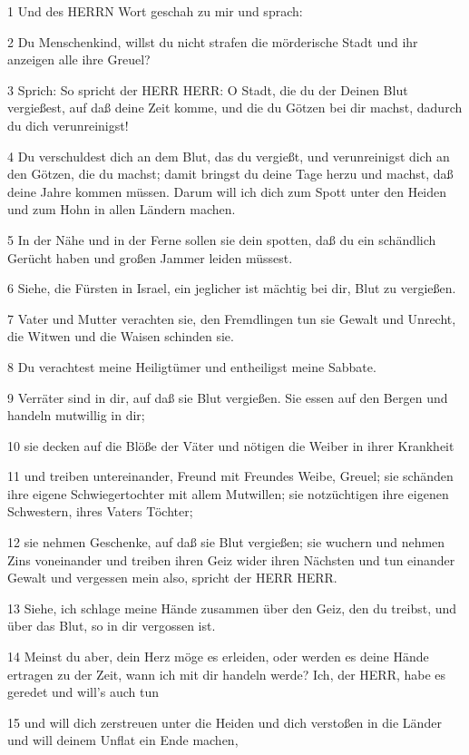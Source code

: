 \par 1 Und des HERRN Wort geschah zu mir und sprach:
\par 2 Du Menschenkind, willst du nicht strafen die mörderische Stadt und ihr anzeigen alle ihre Greuel?
\par 3 Sprich: So spricht der HERR HERR: O Stadt, die du der Deinen Blut vergießest, auf daß deine Zeit komme, und die du Götzen bei dir machst, dadurch du dich verunreinigst!
\par 4 Du verschuldest dich an dem Blut, das du vergießt, und verunreinigst dich an den Götzen, die du machst; damit bringst du deine Tage herzu und machst, daß deine Jahre kommen müssen. Darum will ich dich zum Spott unter den Heiden und zum Hohn in allen Ländern machen.
\par 5 In der Nähe und in der Ferne sollen sie dein spotten, daß du ein schändlich Gerücht haben und großen Jammer leiden müssest.
\par 6 Siehe, die Fürsten in Israel, ein jeglicher ist mächtig bei dir, Blut zu vergießen.
\par 7 Vater und Mutter verachten sie, den Fremdlingen tun sie Gewalt und Unrecht, die Witwen und die Waisen schinden sie.
\par 8 Du verachtest meine Heiligtümer und entheiligst meine Sabbate.
\par 9 Verräter sind in dir, auf daß sie Blut vergießen. Sie essen auf den Bergen und handeln mutwillig in dir;
\par 10 sie decken auf die Blöße der Väter und nötigen die Weiber in ihrer Krankheit
\par 11 und treiben untereinander, Freund mit Freundes Weibe, Greuel; sie schänden ihre eigene Schwiegertochter mit allem Mutwillen; sie notzüchtigen ihre eigenen Schwestern, ihres Vaters Töchter;
\par 12 sie nehmen Geschenke, auf daß sie Blut vergießen; sie wuchern und nehmen Zins voneinander und treiben ihren Geiz wider ihren Nächsten und tun einander Gewalt und vergessen mein also, spricht der HERR HERR.
\par 13 Siehe, ich schlage meine Hände zusammen über den Geiz, den du treibst, und über das Blut, so in dir vergossen ist.
\par 14 Meinst du aber, dein Herz möge es erleiden, oder werden es deine Hände ertragen zu der Zeit, wann ich mit dir handeln werde? Ich, der HERR, habe es geredet und will's auch tun
\par 15 und will dich zerstreuen unter die Heiden und dich verstoßen in die Länder und will deinem Unflat ein Ende machen,
